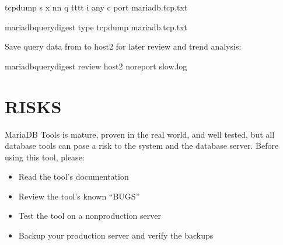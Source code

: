 \documentclass[letterpaper,10pt,english]{sphinxmanual}
\begin{document}
\begin{sphinxVerbatim}[commandchars=\\\{\}]
tcpdump \PYGZhy{}s  \PYGZhy{}x \PYGZhy{}nn \PYGZhy{}q \PYGZhy{}tttt \PYGZhy{}i any \PYGZhy{}c  port  \PYGZgt{} mariadb.tcp.txt

mariadb\PYGZhy{}query\PYGZhy{}digest \PYGZhy{}\PYGZhy{}type tcpdump mariadb.tcp.txt
\end{sphinxVerbatim}

\sphinxAtStartPar
Save query data from  to host2 for later review and trend analysis:

\begin{sphinxVerbatim}[commandchars=\\\{\}]
mariadb\PYGZhy{}query\PYGZhy{}digest \PYGZhy{}\PYGZhy{}review host2 \PYGZhy{}\PYGZhy{}no\PYGZhy{}report slow.log
\end{sphinxVerbatim}


\section{RISKS}
\label{\detokenize{mariadb-query-digest:risks}}
\sphinxAtStartPar
MariaDB Tools is mature, proven in the real world, and well tested,
but all database tools can pose a risk to the system and the database
server.  Before using this tool, please:
\begin{itemize}
\item {} 
\sphinxAtStartPar
Read the tool’s documentation

\item {} 
\sphinxAtStartPar
Review the tool’s known “BUGS”

\item {} 
\sphinxAtStartPar
Test the tool on a non\sphinxhyphen{}production server

\item {} 
\sphinxAtStartPar
Backup your production server and verify the backups

\end{itemize}
\end{document}
